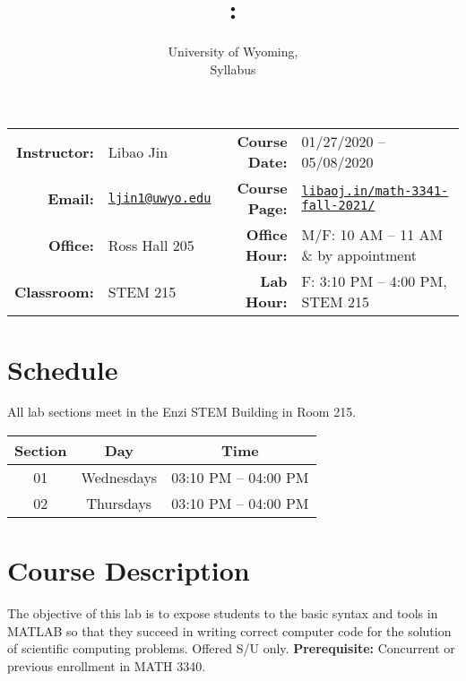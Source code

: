 \documentclass[11pt, letterpaper]{article}
\title{\vspace{-2ex}\courseNum: \courseTitle \vspace{-2ex}}
\author{University of Wyoming, \semester \\ Syllabus \vspace{-2ex}}
\date{}
\begin{document}
\thispagestyle{plain}
\maketitle

\begin{table}[!htbp]
\begin{tabular}{rlrl}
    \textbf{Instructor:} & Libao Jin & \textbf{Course Date:} & 01/27/2020 -- 05/08/2020 \\
    \textbf{Email:} & \href{mailto:ljin1@uwyo.edu?subject=[MATH-3341]}{\texttt{ljin1@uwyo.edu}} \hspace{5pt} & \textbf{Course Page:} & \href{https://libaoj.in/math-3341-fall-2021/}{\texttt{libaoj.in/math-3341-fall-2021/}} \\
    \textbf{Office:} & Ross Hall 205 &  \textbf{Office Hour:} & M/F: 10 AM -- 11 AM \& by appointment \\
    \textbf{Classroom:} & STEM 215 \hspace{5pt} & \textbf{Lab Hour:} & F: 3:10 PM -- 4:00 PM, STEM 215 \end{tabular}
\end{table}

\section*{Schedule}
All lab sections meet in the Enzi STEM Building in Room 215.
\begin{table}[!hbtp]
    \centering
    \begin{tabular}{ccc}
        \toprule
        Section & Day & Time \\
        \midrule
        01 & Wednesdays & 03:10 PM -- 04:00 PM \\
        02 & Thursdays  & 03:10 PM -- 04:00 PM \\
        \bottomrule
    \end{tabular}
\end{table}
\vspace{-10pt}
\section*{Course Description}
The objective of this lab is to expose students to the basic syntax and tools in MATLAB so that they succeed in writing correct computer code for the solution of scientific computing problems. Offered S/U only. \textbf{Prerequisite:} Concurrent or previous enrollment in MATH 3340.
\end{document}
